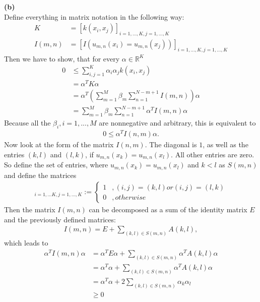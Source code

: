 \documentclass[a4paper]{article}
\newcommand{\1}{\mathds{1}}
\begin{document}
\textbf{(b)}\\
Define everything in matrix notation in the following way:
\begin{align*}
K&=[k(x_i,x_j)]_{i=1,...,K,j=1,...,K}\\
I(m,n)&=[I(u_{m,n}(x_i)=u_{m,n}(x_j))]_{i=1,...,K,j=1,...,K}
\end{align*}
Then we have to show, that for every $\alpha\in\mathbb{R}^K$ 
\begin{align*}
0&\leq\sum_{i,j=1}^{K}\alpha_i\alpha_jk(x_i,x_j)\\
&=\alpha^TK\alpha\\
&=\alpha^T\left(\sum_{m=1}^{M}\beta_m\sum_{n=1}^{N-m+1}I(m,n)\right)\alpha\\
&=\sum_{m=1}^{M}\beta_m\sum_{n=1}^{N-m+1}\alpha^TI(m,n)\alpha
\end{align*}
Because all the $\beta_i,i=1,...,M$ are nonnegative and arbitrary, this is equivalent to
\begin{align*}
0\leq\alpha^TI(n,m)\alpha.
\end{align*}
Now look at the form of the matrix $I(n,m)$. The diagonal is $1$, as well as the entries $(k,l)$ and $(l,k)$, if $u_{m,n}(x_k)=u_{m,n}(x_l)$. All other entries are zero.\\
So define the set of entries, where $u_{m,n}(x_k)=u_{m,n}(x_l)$ and $k<l$ as $S(m,n)$ and define the matrices
\begin{align*}
[A(k,l)]_{i=1,...K,j=1,...,K}:=\begin{cases}
1 &,(i,j)=(k,l) or (i,j)=(l,k)\\
0 &,otherwise
\end{cases}
\end{align*}
Then the matrix $I(m,n)$ can be decomposed as a sum of the identity matrix $E$ and the previously defined matrices:
\begin{align*}
I(m,n)=E+\sum_{(k,l)\in S(m,n)}A(k,l),
\end{align*}
which leads to
\begin{align*}
\alpha^TI(m,n)\alpha&=\alpha^TE\alpha+\sum_{(k,l)\in S(m,n)}\alpha^TA(k,l)\alpha\\
&=\alpha^T\alpha+\sum_{(k,l)\in S(m,n)}\alpha^TA(k,l)\alpha\\
&=\alpha^T\alpha+2\sum_{(k,l)\in S(m,n)}\alpha_k\alpha_l\\
&\geq 0
\end{align*}
\end{document}
